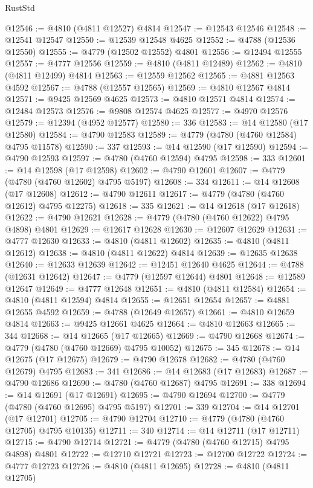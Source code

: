 \begin{lexlean}{RustStd}
\begin{coremodule}
@12546 := @4810 (@4811 @12527) @4814
@12547 := @12543 @12546
@12548 := @12541 @12547
@12550 := @12539 @12548 @4625
@12552 := @4788 (@12536 @12550)
@12555 := @4779 (@12502 @12552) @4801
@12556 := @12494 @12555
@12557 := @4777 @12556
@12559 := @4810 (@4811 @12489)
@12562 := @4810 (@4811 @12499) @4814
@12563 := @12559 @12562
@12565 := @4881 @12563 @4592
@12567 := @4788 (@12557 @12565)
@12569 := @4810 @12567 @4814
@12571 := @9425 @12569 @4625
@12573 := @4810 @12571 @4814
@12574 := @12484 @12573
@12576 := @9808 @12574 @4625
@12577 := @4970 @12576
@12579 := @12394 (@4952 @12577)
@12580 := 336
@12583 := @14 @12580 (@17 @12580)
@12584 := @4790 @12583
@12589 := @4779 (@4780 (@4760 @12584) @4795 @11578)
@12590 := 337
@12593 := @14 @12590 (@17 @12590)
@12594 := @4790 @12593
@12597 := @4780 (@4760 @12594) @4795
@12598 := 333
@12601 := @14 @12598 (@17 @12598)
@12602 := @4790 @12601
@12607 := @4779 (@4780 (@4760 @12602) @4795 @5197)
@12608 := 334
@12611 := @14 @12608 (@17 @12608)
@12612 := @4790 @12611
@12617 := @4779 (@4780 (@4760 @12612) @4795 @12275)
@12618 := 335
@12621 := @14 @12618 (@17 @12618)
@12622 := @4790 @12621
@12628 := @4779 (@4780 (@4760 @12622) @4795 @4898) @4801
@12629 := @12617 @12628
@12630 := @12607 @12629
@12631 := @4777 @12630
@12633 := @4810 (@4811 @12602)
@12635 := @4810 (@4811 @12612)
@12638 := @4810 (@4811 @12622) @4814
@12639 := @12635 @12638
@12640 := @12633 @12639
@12642 := @12451 @12640 @4625
@12644 := @4788 (@12631 @12642)
@12647 := @4779 (@12597 @12644) @4801
@12648 := @12589 @12647
@12649 := @4777 @12648
@12651 := @4810 (@4811 @12584)
@12654 := @4810 (@4811 @12594) @4814
@12655 := @12651 @12654
@12657 := @4881 @12655 @4592
@12659 := @4788 (@12649 @12657)
@12661 := @4810 @12659 @4814
@12663 := @9425 @12661 @4625
@12664 := @4810 @12663
@12665 := 344
@12668 := @14 @12665 (@17 @12665)
@12669 := @4790 @12668
@12674 := @4779 (@4780 (@4760 @12669) @4795 @10052)
@12675 := 345
@12678 := @14 @12675 (@17 @12675)
@12679 := @4790 @12678
@12682 := @4780 (@4760 @12679) @4795
@12683 := 341
@12686 := @14 @12683 (@17 @12683)
@12687 := @4790 @12686
@12690 := @4780 (@4760 @12687) @4795
@12691 := 338
@12694 := @14 @12691 (@17 @12691)
@12695 := @4790 @12694
@12700 := @4779 (@4780 (@4760 @12695) @4795 @5197)
@12701 := 339
@12704 := @14 @12701 (@17 @12701)
@12705 := @4790 @12704
@12710 := @4779 (@4780 (@4760 @12705) @4795 @10135)
@12711 := 340
@12714 := @14 @12711 (@17 @12711)
@12715 := @4790 @12714
@12721 := @4779 (@4780 (@4760 @12715) @4795 @4898) @4801
@12722 := @12710 @12721
@12723 := @12700 @12722
@12724 := @4777 @12723
@12726 := @4810 (@4811 @12695)
@12728 := @4810 (@4811 @12705)

\end{coremodule}
\end{lexlean}
